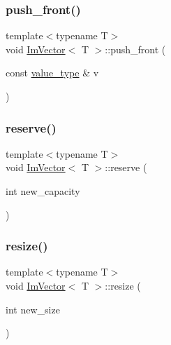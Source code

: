 \hypertarget{class_im_vector_a9a21cfec59d057cba605da14682180d2}{}\label{class_im_vector_a9a21cfec59d057cba605da14682180d2} 
\subsubsection{\texorpdfstring{push\+\_\+front()}{push\_front()}}
{\footnotesize\ttfamily template$<$typename T$>$ \\
void \hyperlink{class_im_vector}{Im\+Vector}$<$ T $>$\+::push\+\_\+front (\begin{DoxyParamCaption}\item[{const \hyperlink{class_im_vector_a8bd77e4e7581d8e5f9e98d7c2f3c2a80}{value\+\_\+type} \&}]{v }\end{DoxyParamCaption})}

\hypertarget{class_im_vector_a0f14f5736c3372157856eebb67123b75}{}\label{class_im_vector_a0f14f5736c3372157856eebb67123b75} 
\subsubsection{\texorpdfstring{reserve()}{reserve()}}
{\footnotesize\ttfamily template$<$typename T$>$ \\
void \hyperlink{class_im_vector}{Im\+Vector}$<$ T $>$\+::reserve (\begin{DoxyParamCaption}\item[{int}]{new\+\_\+capacity }\end{DoxyParamCaption})}

\hypertarget{class_im_vector_ac371dd62e56ae486b1a5038cf07eee56}{}\label{class_im_vector_ac371dd62e56ae486b1a5038cf07eee56} 
\subsubsection{\texorpdfstring{resize()}{resize()}\hspace{0.1cm}{\footnotesize\ttfamily [1/2]}}
{\footnotesize\ttfamily template$<$typename T$>$ \\
void \hyperlink{class_im_vector}{Im\+Vector}$<$ T $>$\+::resize (\begin{DoxyParamCaption}\item[{int}]{new\+\_\+size }\end{DoxyParamCaption})}

